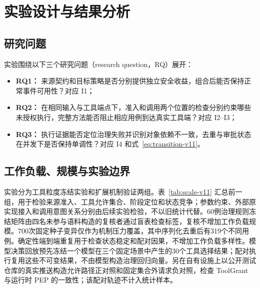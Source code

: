 \section{实验设计与结果分析}\label{sec:evaluation-v11}

\subsection{研究问题}

实验围绕以下三个研究问题（research question，RQ）展开：
\begin{itemize}
  \item \textbf{RQ1：} 来源契约和目标策略是否分别提供独立安全收益，组合后能否保持正常事件可用性？对应 I1；
  \item \textbf{RQ2：} 在相同输入与工具端点下，准入和调用两个位置的检查分别约束哪些未授权执行，完整方法能否阻止相应用例到达真实工具端？对应 I2--I3；
  \item \textbf{RQ3：} 执行证据能否定位治理失败并识别对象依赖不一致，去重与审批状态在并发下是否保持单调性？对应 I4 和式~\eqref{eq:transition-v11}。
\end{itemize}

\subsection{工作负载、规模与实验边界}

实验分为工具粒度冻结实验和扩展机制验证两组。表~\ref{tab:scale-v11} 汇总前一组，用于检验来源准入、工具允许集合、阶段定位和状态竞争；参数约束、外部原实现接入和调用意图关系分别由后续实验检验，不以旧统计代替。60例治理规则冻结矩阵由四名未参与语料构造的复核者通过盲表检查标签，复核不增加工作负载规模。700次固定种子变异仅作为机制压力覆盖，其中序列化去重后有319个不同用例。确定性端到端重复用于检查状态稳定和配对因果，不增加工作负载多样性。模型决策回放预先冻结一个模型在三个固定场景中产生的30个工具选择结果；配对执行复用这些不可变结果，不由模型构造治理回归向量。另在自有设施上以公开测试仓库的真实推送构造允许路径正对照和固定集合外请求负对照，检查 ToolGrant 与运行时 PEP 的一致性；该配对轨迹不计入统计样本。

